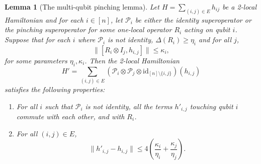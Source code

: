\documentclass[11pt]{article}
\theoremstyle{plain}
\newtheorem{lemma}[theorem]{Lemma}
\renewcommand{\cP}{\mathcal{P}}
\begin{document}
\begin{lemma}[The multi-qubit pinching lemma]\label{lemma:double-extra-cheese}
    Let $H = \sum_{(i,j) \in E} h_{ij}$ be a 2-local Hamiltonian and for each $i \in [n]$, let $\mathcal{P}_i$ be either the identity superoperator or the pinching superoperator for some one-local operator $R_i$ acting on qubit $i$. Suppose that for each $i$ where $\mathcal{P}_i$ is not identity, $\Delta(R_i) \geq \eta_i$ and for all $j$, 
    \[ \|[R_i \otimes I_j, h_{i,j} ] \| \leq \kappa_i,\]
    for some parameters $\eta_i, \kappa_i$.
    Then the 2-local Hamiltonian
    \begin{equation}\label{eqn:definition-of-H-prime}
        H' = \sum_{(i,j) \in E} (\cP_i \otimes \cP_j \otimes \mathrm{id}_{[n]\setminus \{i,j\}})( h_{i,j})
    \end{equation}
    satisfies the following properties:
    \begin{enumerate}
        \item For all $i$ such that $\cP_i$ is not identity, all the terms $h'_{i,j}$ touching qubit $i$ commute with each other, and with $R_i$.
        \item For all $(i,j) \in E$,
        \begin{equation} \| h'_{i,j} - h_{i,j} \| \leq 4 \left(\frac{\kappa_i}{\eta_i} +  \frac{\kappa_j}{\eta_j}\right). \label{eq:cheese-rounding-error} \end{equation}
    \end{enumerate}
\end{lemma}
\end{document}
